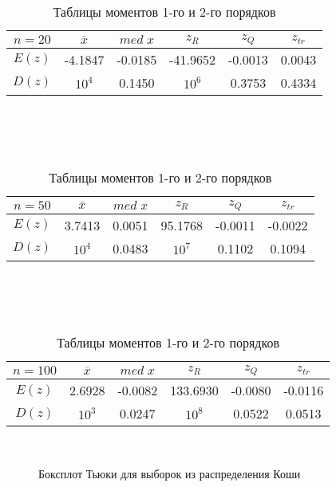 \documentclass[12pt]{article}
\begin{document}
\begin{table}[h!]
	\begin{tabular}{ | c | c | c | c | c | c |}
	\hline
	$n = 20$ & $\overline{x}$ & $med\;x$ & $z_R$ & $z_Q$ & $z_{tr}$ \\ \hline
	$E(z)$ & -4.1847 & -0.0185 & -41.9652 & -0.0013 & 0.0043 \\ \hline
	$D(z)$ & $10^4$ & 0.1450 & $10^6$ & 0.3753 & 0.4334 \\ \hline
	\end{tabular}
	\\
	\\ \\ 
	\begin{tabular}{ | c | c | c | c | c | c |}
	\hline
	$n = 50$ & $\overline{x}$ & $med\;x$ & $z_R$ & $z_Q$ & $z_{tr}$ \\ \hline
	$E(z)$ & 3.7413 & 0.0051 & 95.1768 & -0.0011 & -0.0022 \\ \hline
	$D(z)$ & $10^4$ & 0.0483 & $10^7$ & 0.1102 & 0.1094 \\ \hline
	\end{tabular}
	\\
	\\ \\ 
	\begin{tabular}{ | c | c | c | c | c | c |}
	\hline
	$n = 100$ & $\overline{x}$ & $med\;x$ & $z_R$ & $z_Q$ & $z_{tr}$ \\ \hline
	$E(z)$ & 2.6928 & -0.0082 & 133.6930 & -0.0080 & -0.0116 \\ \hline
	$D(z)$ & $10^3$ & 0.0247 & $10^8$ & 0.0522 & 0.0513 \\ \hline
	\end{tabular}
	\caption*{Таблицы моментов 1-го и 2-го порядков}
	\indent{}\\
\end{table}
\begin{center}
\end{center}

\begin{figure}[h!]
\centering
{}
\label{3_pic:2}
\caption{Боксплот Тьюки для выборок из распределения Коши}
\end{figure}
\end{document}
